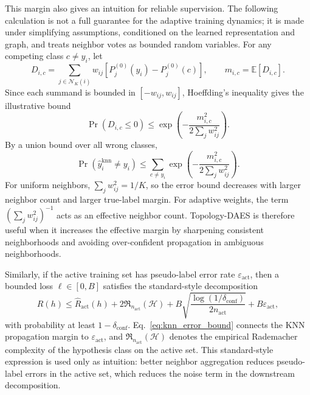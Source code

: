 This margin also gives an intuition for reliable supervision. The following
calculation is not a full guarantee for the adaptive training dynamics; it is
made under simplifying assumptions, conditioned on the learned representation
and graph, and treats neighbor votes as bounded random variables. For any
competing class $c\ne y_i$, let
\begin{equation}
    D_{i,c}=\sum_{j\in\mathcal{N}_K(i)}
    w_{ij}\left[P^{(0)}_j(y_i)-P^{(0)}_j(c)\right],
    \qquad
    m_{i,c}=\mathbb{E}[D_{i,c}].
\end{equation}
Since each summand is bounded in $[-w_{ij},w_{ij}]$, Hoeffding's inequality
gives the illustrative bound
\begin{equation}
    \Pr(D_{i,c}\le 0)
    \le
    \exp\left(
    -\frac{m_{i,c}^{2}}{2\sum_j w_{ij}^{2}}
    \right).
    \label{eq:knn_pair_error}
\end{equation}
By a union bound over all wrong classes,
\begin{equation}
    \Pr(\hat{y}^{\mathrm{knn}}_i\ne y_i)
    \le
    \sum_{c\ne y_i}
    \exp\left(
    -\frac{m_{i,c}^{2}}{2\sum_j w_{ij}^{2}}
    \right).
    \label{eq:knn_error_bound}
\end{equation}
For uniform neighbors, $\sum_jw_{ij}^2=1/K$, so the error bound decreases with
larger neighbor count and larger true-label margin. For adaptive weights, the
term $(\sum_jw_{ij}^2)^{-1}$ acts as an effective neighbor count. Topology-DAES
is therefore useful when it increases the effective margin by sharpening
consistent neighborhoods and avoiding over-confident propagation in ambiguous
neighborhoods.

Similarly, if the active training set has pseudo-label error rate
$\varepsilon_{\mathrm{act}}$, then a bounded loss $\ell\in[0,B]$ satisfies the
standard-style decomposition
\begin{equation}
    R(h)
    \le
    \hat{R}_{\mathrm{act}}(h)
    + 2\mathfrak{R}_{n_{\mathrm{act}}}(\mathcal{H})
    + B\sqrt{\frac{\log(1/\delta_{\mathrm{conf}})}{2n_{\mathrm{act}}}}
    + B\varepsilon_{\mathrm{act}},
    \label{eq:active_bound}
\end{equation}
with probability at least $1-\delta_{\mathrm{conf}}$. Eq.~\eqref{eq:knn_error_bound} connects
the KNN propagation margin to $\varepsilon_{\mathrm{act}}$, and
$\mathfrak{R}_{n_{\mathrm{act}}}(\mathcal{H})$ denotes the empirical
Rademacher complexity of the hypothesis class on the active set. This
standard-style expression is used only as intuition: better neighbor
aggregation reduces pseudo-label errors in the active set, which reduces the
noise term in the downstream decomposition.

